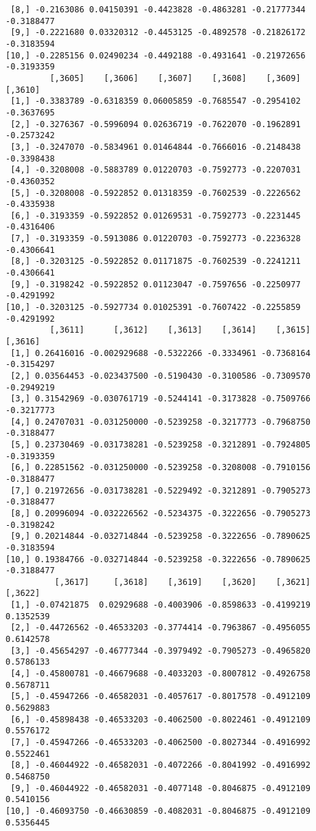 \documentclass[
  letterpaper,
  DIV=11,
  numbers=noendperiod]{scrreprt}
\begin{document}
\begin{verbatim}
 [8,] -0.2163086 0.04150391 -0.4423828 -0.4863281 -0.21777344 -0.3188477
 [9,] -0.2221680 0.03320312 -0.4453125 -0.4892578 -0.21826172 -0.3183594
[10,] -0.2285156 0.02490234 -0.4492188 -0.4931641 -0.21972656 -0.3193359
         [,3605]    [,3606]    [,3607]    [,3608]    [,3609]    [,3610]
 [1,] -0.3383789 -0.6318359 0.06005859 -0.7685547 -0.2954102 -0.3637695
 [2,] -0.3276367 -0.5996094 0.02636719 -0.7622070 -0.1962891 -0.2573242
 [3,] -0.3247070 -0.5834961 0.01464844 -0.7666016 -0.2148438 -0.3398438
 [4,] -0.3208008 -0.5883789 0.01220703 -0.7592773 -0.2207031 -0.4360352
 [5,] -0.3208008 -0.5922852 0.01318359 -0.7602539 -0.2226562 -0.4335938
 [6,] -0.3193359 -0.5922852 0.01269531 -0.7592773 -0.2231445 -0.4316406
 [7,] -0.3193359 -0.5913086 0.01220703 -0.7592773 -0.2236328 -0.4306641
 [8,] -0.3203125 -0.5922852 0.01171875 -0.7602539 -0.2241211 -0.4306641
 [9,] -0.3198242 -0.5922852 0.01123047 -0.7597656 -0.2250977 -0.4291992
[10,] -0.3203125 -0.5927734 0.01025391 -0.7607422 -0.2255859 -0.4291992
         [,3611]      [,3612]    [,3613]    [,3614]    [,3615]    [,3616]
 [1,] 0.26416016 -0.002929688 -0.5322266 -0.3334961 -0.7368164 -0.3154297
 [2,] 0.03564453 -0.023437500 -0.5190430 -0.3100586 -0.7309570 -0.2949219
 [3,] 0.31542969 -0.030761719 -0.5244141 -0.3173828 -0.7509766 -0.3217773
 [4,] 0.24707031 -0.031250000 -0.5239258 -0.3217773 -0.7968750 -0.3188477
 [5,] 0.23730469 -0.031738281 -0.5239258 -0.3212891 -0.7924805 -0.3193359
 [6,] 0.22851562 -0.031250000 -0.5239258 -0.3208008 -0.7910156 -0.3188477
 [7,] 0.21972656 -0.031738281 -0.5229492 -0.3212891 -0.7905273 -0.3188477
 [8,] 0.20996094 -0.032226562 -0.5234375 -0.3222656 -0.7905273 -0.3198242
 [9,] 0.20214844 -0.032714844 -0.5239258 -0.3222656 -0.7890625 -0.3183594
[10,] 0.19384766 -0.032714844 -0.5239258 -0.3222656 -0.7890625 -0.3188477
          [,3617]     [,3618]    [,3619]    [,3620]    [,3621]   [,3622]
 [1,] -0.07421875  0.02929688 -0.4003906 -0.8598633 -0.4199219 0.1352539
 [2,] -0.44726562 -0.46533203 -0.3774414 -0.7963867 -0.4956055 0.6142578
 [3,] -0.45654297 -0.46777344 -0.3979492 -0.7905273 -0.4965820 0.5786133
 [4,] -0.45800781 -0.46679688 -0.4033203 -0.8007812 -0.4926758 0.5678711
 [5,] -0.45947266 -0.46582031 -0.4057617 -0.8017578 -0.4912109 0.5629883
 [6,] -0.45898438 -0.46533203 -0.4062500 -0.8022461 -0.4912109 0.5576172
 [7,] -0.45947266 -0.46533203 -0.4062500 -0.8027344 -0.4916992 0.5522461
 [8,] -0.46044922 -0.46582031 -0.4072266 -0.8041992 -0.4916992 0.5468750
 [9,] -0.46044922 -0.46582031 -0.4077148 -0.8046875 -0.4912109 0.5410156
[10,] -0.46093750 -0.46630859 -0.4082031 -0.8046875 -0.4912109 0.5356445

\end{verbatim}
\end{document}
